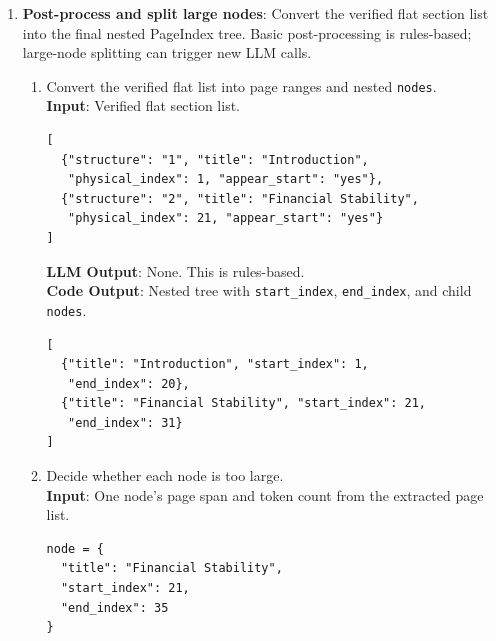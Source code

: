 \documentclass[11pt,a4paper]{article}
\newcommand{\fieldname}[1]{\textcolor{red!70!black}{\texttt{#1}}}
\begin{document}
\begin{enumerate}
\begin{itemize}
\begin{enumerate}[label=(\alph*)]
\begin{lstlisting}[style=pageTextBlockInList]
<physical_index_8>
Introduction ...
<physical_index_8>
\end{lstlisting}
            \item The LLM returns physical start pages for the ToC titles.
\begin{lstlisting}[style=pageTextBlockInList]
[
  {"structure": "1", "title": "Introduction",
   "physical_index": 8},
  {"structure": "2", "title": "Monetary Policy",
   "physical_index": 14}
]
\end{lstlisting}
            \item Verify the mapped physical indexes. If verification still fails, run the no-ToC generation path.
            \item This fallback is used after the page-number path fails; it is not the normal top-level path for \texttt{page\_index\_given\_in\_toc: "no"}.
        \end{enumerate}
    \end{itemize}

    \item \textbf{Post-process and split large nodes}: Convert the verified flat section list into the final nested PageIndex tree. Basic post-processing is rules-based; large-node splitting can trigger new LLM calls.
    \begin{enumerate}[label=(\alph*)]
        \item Convert the verified flat list into page ranges and nested \fieldname{nodes}. \\
        \textbf{Input}: Verified flat section list.
\begin{lstlisting}[style=pageTextBlockInList]
[
  {"structure": "1", "title": "Introduction",
   "physical_index": 1, "appear_start": "yes"},
  {"structure": "2", "title": "Financial Stability",
   "physical_index": 21, "appear_start": "yes"}
]
\end{lstlisting}
        \textbf{LLM Output}: None. This is rules-based. \\
        \textbf{Code Output}: Nested tree with \fieldname{start\_index}, \fieldname{end\_index}, and child \fieldname{nodes}.
\begin{lstlisting}[style=pageTextBlockInList]
[
  {"title": "Introduction", "start_index": 1,
   "end_index": 20},
  {"title": "Financial Stability", "start_index": 21,
   "end_index": 31}
]
\end{lstlisting}

        \item Decide whether each node is too large. \\
        \textbf{Input}: One node's page span and token count from the extracted page list.
\begin{lstlisting}[style=pageTextBlockInList]
node = {
  "title": "Financial Stability",
  "start_index": 21,
  "end_index": 35
}


\end{lstlisting}
\end{enumerate}
\end{enumerate}
\end{document}
